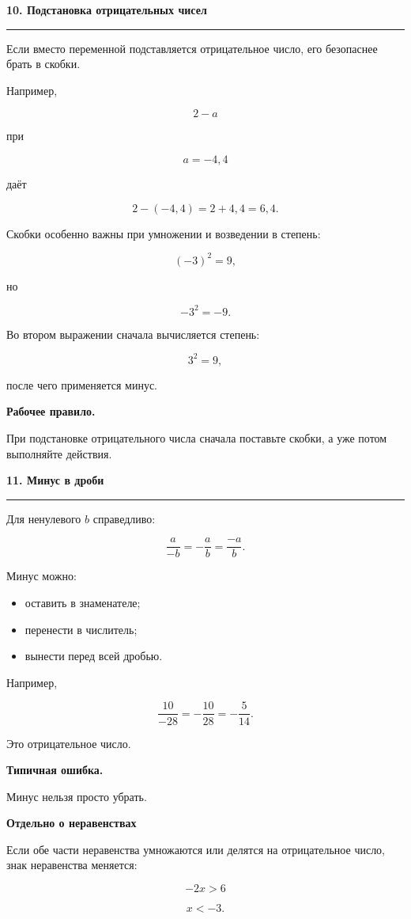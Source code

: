 \documentclass[a4paper,12pt]{article}
\newcommand{\topic}[1]{%
    \par\vspace{0.9em}%
    {\Large\bfseries\color{darkaccent}#1}\par
    \vspace{0.25em}
    \noindent
    \color{accent}\rule{\linewidth}{0.6pt}
    \color{black}
    \vspace{0.55em}
}
\newcommand{\subtopic}[1]{%
    \par\vspace{0.55em}%
    {\large\bfseries\color{textgray}#1}\par
    \vspace{0.2em}
}
\newcommand{\important}[1]{%
    \textbf{\color{darkaccent}#1}%
}
\begin{document}
\topic{10. Подстановка отрицательных чисел}

Если вместо переменной подставляется отрицательное число,
его безопаснее брать в скобки.

Например,

\[
2-a
\]

при

\[
a=-4{,}4
\]

даёт

\[
2-(-4{,}4)
=
2+4{,}4
=
6{,}4.
\]

Скобки особенно важны при умножении и возведении в степень:

\[
(-3)^2=9,
\]

но

\[
-3^2=-9.
\]

Во втором выражении сначала вычисляется степень:

\[
3^2=9,
\]

после чего применяется минус.

\important{Рабочее правило.}
При подстановке отрицательного числа сначала поставьте скобки,
а уже потом выполняйте действия.


\topic{11. Минус в дроби}

Для ненулевого $b$ справедливо:

\[
\frac{a}{-b}
=
-\frac{a}{b}
=
\frac{-a}{b}.
\]

Минус можно:

\begin{itemize}
    \item оставить в знаменателе;
    \item перенести в числитель;
    \item вынести перед всей дробью.
\end{itemize}

Например,

\[
\frac{10}{-28}
=
-\frac{10}{28}
=
-\frac{5}{14}.
\]

Это отрицательное число.

\important{Типичная ошибка.}
Минус нельзя просто убрать.

\subtopic{Отдельно о неравенствах}

Если обе части неравенства умножаются или делятся
на отрицательное число, знак неравенства меняется:

\[
-2x>6
\]

\[
x<-3.
\]
\end{document}
